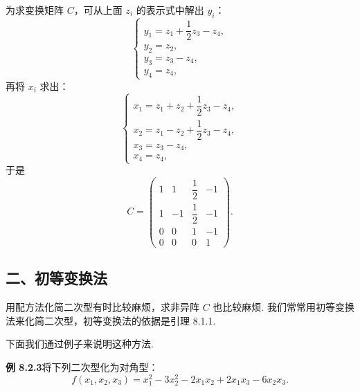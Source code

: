 \documentclass[UTF8, 12pt, fontset=fandol, oneside]{ctexart}
\begin{document}
为求变换矩阵 $C$，可从上面 $z_i$ 的表示式中解出 $y_i$：
\[
\left\{\begin{array}{l}
y_1=z_1+\dfrac12z_3-z_4,\\
y_2=z_2,\\
y_3=z_3-z_4,\\
y_4=z_4,
\end{array}\right.
\]
再将 $x_i$ 求出：
\[
\left\{\begin{array}{l}
x_1=z_1+z_2+\dfrac12z_3-z_4,\\
x_2=z_1-z_2+\dfrac12z_3-z_4,\\
x_3=z_3-z_4,\\
x_4=z_4,
\end{array}\right.
\]
于是
\[
C=\left(\begin{array}{cccc}
1&1&\dfrac12&-1\\
1&-1&\dfrac12&-1\\
0&0&1&-1\\
0&0&0&1
\end{array}\right).
\]

\subsection*{二、初等变换法}

用配方法化简二次型有时比较麻烦，求非异阵 $C$ 也比较麻烦. 我们常常用初等变换法来化简二次型，初等变换法的依据是引理 8.1.1.

下面我们通过例子来说明这种方法.

\noindent\textbf{例 8.2.3}\quad 将下列二次型化为对角型：
\[
f(x_1,x_2,x_3)=x_1^2-3x_2^2-2x_1x_2+2x_1x_3-6x_2x_3.
\]
\end{document}
